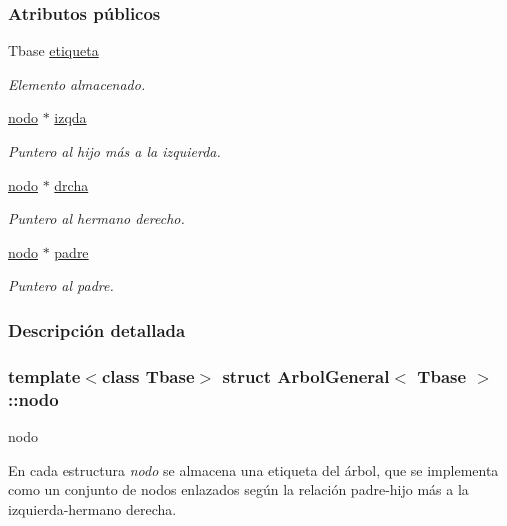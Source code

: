 \subsubsection*{Atributos públicos}
\begin{DoxyCompactItemize}
\item 
Tbase \hyperlink{structArbolGeneral_1_1nodo_ab7223965c5a62aa93895f3decd7a109a}{etiqueta}
\begin{DoxyCompactList}\small\item\em Elemento almacenado. \end{DoxyCompactList}\item 
\hyperlink{structArbolGeneral_1_1nodo}{nodo} $\ast$ \hyperlink{structArbolGeneral_1_1nodo_a3b8075b9fd0dc27c2272ba48bd9a9221}{izqda}
\begin{DoxyCompactList}\small\item\em Puntero al hijo más a la izquierda. \end{DoxyCompactList}\item 
\hyperlink{structArbolGeneral_1_1nodo}{nodo} $\ast$ \hyperlink{structArbolGeneral_1_1nodo_a8d0a58447171461212942f9308ef4f36}{drcha}
\begin{DoxyCompactList}\small\item\em Puntero al hermano derecho. \end{DoxyCompactList}\item 
\hyperlink{structArbolGeneral_1_1nodo}{nodo} $\ast$ \hyperlink{structArbolGeneral_1_1nodo_ab4d70a0179e8450b2842bbf1a6481402}{padre}
\begin{DoxyCompactList}\small\item\em Puntero al padre. \end{DoxyCompactList}\end{DoxyCompactItemize}


\subsubsection{Descripción detallada}
\subsubsection*{template$<$class Tbase$>$\newline
struct Arbol\+General$<$ Tbase $>$\+::nodo}

nodo 

En cada estructura {\itshape nodo} se almacena una etiqueta del árbol, que se implementa como un conjunto de nodos enlazados según la relación padre-\/hijo más a la izquierda-\/hermano derecha. 

